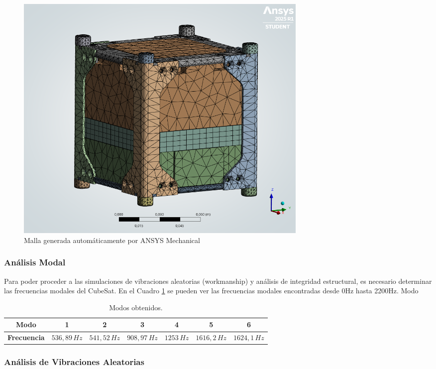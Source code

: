       \begin{figure}[H]
        \centering
        \includegraphics[width=0.7\textwidth]{image/fem/ansys_cubesat-mesh.png}
        \caption{Malla generada automáticamente por ANSYS Mechanical}
        \label{fig:fem_mesh}
      \end{figure}

    \subsubsection{Análisis Modal}

      Para poder proceder a las simulaciones de vibraciones aleatorias (workmanship) y análisis
      de integridad estructural, es necesario determinar las frecuencias modales del CubeSat. En
      el Cuadro \ref{tab:modos_obtenidos} se pueden ver las frecuencias modales encontradas desde 0Hz hasta 2200Hz.
      Modo

      \begin{table}[H]
      \centering
      \begin{tabular}{|c|c|c|c|c|c|c|}
      \hline
      \textbf{Modo}       & 1           & 2           & 3           & 4         & 5           & 6          \\
      \hline
      \textbf{Frecuencia} & $536{,}89\,Hz$ & $541{,}52\,Hz$ & $908{,}97\,Hz$ & $1253\,Hz$ & $1616{,}2\,Hz$ & $1624{,}1\,Hz$ \\
      \hline
      \end{tabular}
      \caption{Modos obtenidos.}
      \label{tab:modos_obtenidos}
      \end{table}

    \subsubsection{Análisis de Vibraciones Aleatorias}

